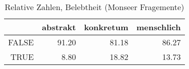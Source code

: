 \begin{table}[ht]
\centering
\begin{tabular}{rrrr}
  \hline
 & abstrakt & konkretum & menschlich \\ 
  \hline
FALSE & 91.20 & 81.18 & 86.27 \\ 
  TRUE & 8.80 & 18.82 & 13.73 \\ 
   \hline
\end{tabular}
\caption{Relative Zahlen, Belebtheit  (Monseer Fragemente)} 
\end{table}
